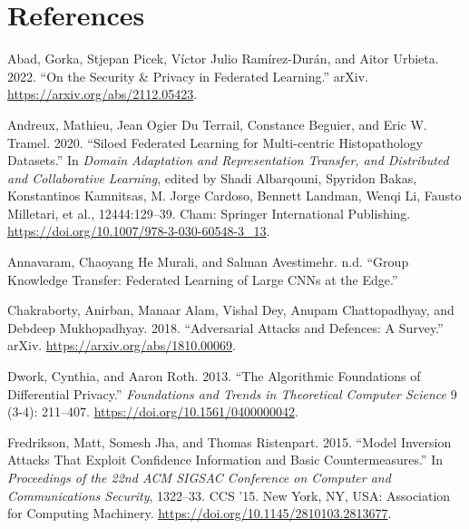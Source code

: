 \hypertarget{references}{%
\section*{References}\label{references}}

\hypertarget{refs}{}
\begin{CSLReferences}{1}{0}
\leavevmode{}%
Abad, Gorka, Stjepan Picek, Víctor Julio Ramírez-Durán, and Aitor
Urbieta. 2022. {``On the {Security} \& {Privacy} in {Federated
Learning}.''} {arXiv}. \url{https://arxiv.org/abs/2112.05423}.

\leavevmode{}%
Andreux, Mathieu, Jean Ogier Du Terrail, Constance Beguier, and Eric W.
Tramel. 2020. {``Siloed {Federated Learning} for {Multi-centric
Histopathology Datasets}.''} In \emph{Domain {Adaptation} and
{Representation Transfer}, and {Distributed} and {Collaborative
Learning}}, edited by Shadi Albarqouni, Spyridon Bakas, Konstantinos
Kamnitsas, M. Jorge Cardoso, Bennett Landman, Wenqi Li, Fausto
Milletari, et al., 12444:129--39. {Cham}: {Springer International
Publishing}. \url{https://doi.org/10.1007/978-3-030-60548-3_13}.

\leavevmode{}%
Annavaram, Chaoyang He Murali, and Salman Avestimehr. n.d. {``Group
{Knowledge Transfer}: {Federated Learning} of {Large CNNs} at the
{Edge}.''}

\leavevmode{}%
Chakraborty, Anirban, Manaar Alam, Vishal Dey, Anupam Chattopadhyay, and
Debdeep Mukhopadhyay. 2018. {``Adversarial {Attacks} and {Defences}: {A
Survey}.''} {arXiv}. \url{https://arxiv.org/abs/1810.00069}.

\leavevmode{}%
Dwork, Cynthia, and Aaron Roth. 2013. {``The {Algorithmic Foundations}
of {Differential Privacy}.''} \emph{Foundations and
Trends\textregistered{} in Theoretical Computer Science} 9 (3-4):
211--407. \url{https://doi.org/10.1561/0400000042}.

\leavevmode{}%
Fredrikson, Matt, Somesh Jha, and Thomas Ristenpart. 2015. {``Model
{Inversion Attacks} That {Exploit Confidence Information} and {Basic
Countermeasures}.''} In \emph{Proceedings of the 22nd {ACM SIGSAC
Conference} on {Computer} and {Communications Security}}, 1322--33.
{CCS} '15. {New York, NY, USA}: {Association for Computing Machinery}.
\url{https://doi.org/10.1145/2810103.2813677}.


\end{CSLReferences}
